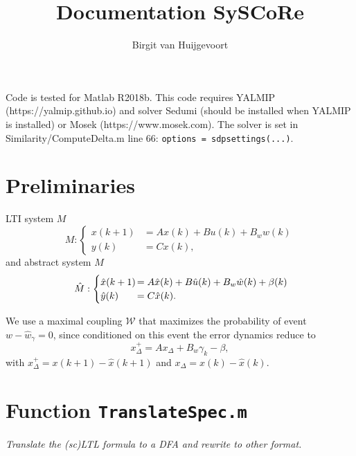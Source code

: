 \documentclass[10pt, onecolumn]{IEEEconf}%
\theoremstyle{definition}
\begin{document}
\title{\vspace{-40pt} Documentation SySCoRe}

\author{Birgit van Huijgevoort}
\maketitle
\thispagestyle{plain}
\pagestyle{plain}

Code is tested for Matlab R2018b. This code requires YALMIP (https://yalmip.github.io) and solver Sedumi (should be installed when YALMIP is installed) or Mosek (https://www.mosek.com). The solver is set in Similarity/ComputeDelta.m line 66: \texttt{options = sdpsettings(...)}.

\section*{Preliminaries}
LTI system $M$
\begin{equation}
M: \begin{cases}
   x(k+1) & = Ax(k)+Bu(k)+B_w w(k) \\
    y(k) & = Cx(k),
\end{cases}
\label{eq:modelLTI}
\end{equation} and abstract system $\hat{M}$
\begin{equation}
\hat{M}: \begin{cases}
   \hat{x}(k+1) &\hspace{-.3cm} = A\hat{x}(k)+B\hat{u}(k)+B_w\hat{w}(k)+\beta(k)  \hspace{-.1cm}\\
    \hat{y}(k) & \hspace{-.3cm}= C\hat{x}(k).
\end{cases}
\label{eq:LTImodelAbs1}
\end{equation}

We use a maximal coupling $\mathcal{W}$ that maximizes the probability of event \mbox{$w-\hat{w}_\gamma=0$}, since conditioned on this event
the error dynamics reduce to
\begin{equation}
x^+_\Delta = Ax_\Delta +B_w\gamma_k - \beta,
\label{eq:errorDyn}
\end{equation} with $x_\Delta^+  = x(k+1)-\hat{x}(k+1) $ and $x_\Delta = x(k)-\hat{x}(k)$.

\section*{Function \texttt{TranslateSpec.m}}
\textit{Translate the (sc)LTL formula to a DFA and rewrite to other format. } \medskip
\end{document}
